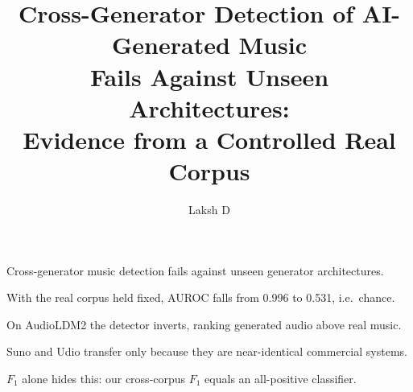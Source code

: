 \documentclass[final,5p,times,twocolumn]{elsarticle}
\begin{document}
\begin{frontmatter}

\title{Cross-Generator Detection of AI-Generated Music\\
Fails Against Unseen Architectures:\\
Evidence from a Controlled Real Corpus}

\author[christ]{Laksh D}


\begin{highlights}
\item Cross-generator music detection fails against unseen generator architectures.
\item With the real corpus held fixed, AUROC falls from 0.996 to 0.531, i.e.\ chance.
\item On AudioLDM2 the detector inverts, ranking generated audio above real music.
\item Suno and Udio transfer only because they are near-identical commercial systems.
\item $F_1$ alone hides this: our cross-corpus $F_1$ equals an all-positive classifier.
\end{highlights}


\end{frontmatter}
\end{document}
